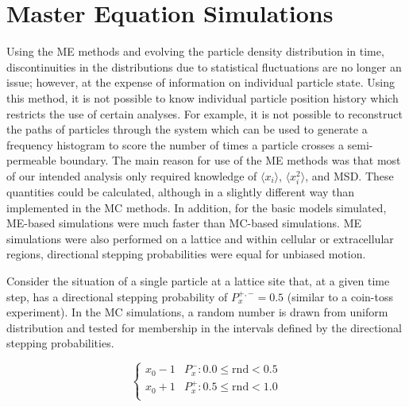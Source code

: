 \section{Master Equation Simulations}
\label{section:me-sims}
	
	Using the ME methods and evolving the particle density distribution in time, discontinuities in the distributions due to statistical fluctuations are no longer an issue; however, at the expense of information on individual particle state. Using this method, it is not possible to know individual particle position history which restricts the use of certain analyses. For example, it is not possible to reconstruct the paths of particles through the system which can be used to generate a frequency histogram to score the number of times a particle crosses a semi-permeable boundary. The main reason for use of the ME methods was that most of our intended analysis only required knowledge of $ \langle x_{i} \rangle $, $ \langle x_{i}^2 \rangle $, and MSD. These quantities could be calculated, although in a slightly different way than implemented in the MC methods. In addition, for the basic models simulated, ME-based simulations were much faster than MC-based simulations. ME simulations were also performed on a lattice and within cellular or extracellular regions, directional stepping probabilities were equal for unbiased motion.
	
	Consider the situation of a single particle at a lattice site that, at a given time step, has a directional stepping probability of $ P_x^{+,-} = 0.5 $ (similar to a coin-toss experiment). In the MC simulations, a random number is drawn from uniform distribution and tested for membership in the intervals defined by the directional stepping probabilities.
	
	\[   \left\{
	\begin{array}{ll}
	      x_0 - 1 & P_x^{-}: 0.0 \leq \textrm{rnd} < 0.5 \\
	      x_0 + 1 & P_x^{+}: 0.5 \leq \textrm{rnd} < 1.0 \\
	\end{array} 
	\right. \]
	
